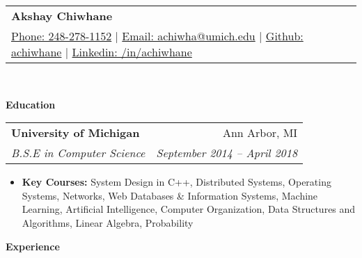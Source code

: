 \documentclass[letterpaper,11pt]{article}
\makeatletter
\newcommand{\resitem}[1]{\item #1 \vspace{-2pt}}
\newcommand{\resheading}[1]{{\large \colorbox{mygrey}{\begin{minipage}{\textwidth}{\textbf{#1 \vphantom{p\^{E}}}}\end{minipage}}}}
\newcommand{\ressubheading}[4]{
\begin{tabular*}{6.875in}{l@{\extracolsep{\fill}}r}
		\textbf{#1} & #2 \\
		\textit{#3} & \textit{#4} \\
\end{tabular*}\vspace{-6pt}}
\renewcommand{\footnotesize}{\fontsize{10pt}{11pt}\selectfont}
\makeatother
\begin{document}
\newcommand{\mywebheader}{
	\begin{tabular*}{7in}{l@{\extracolsep{\fill}}r}
		\textbf{{\LARGE Akshay Chiwhane}} \\
		\href{tel:248-278-1152}{Phone: 248-278-1152} |
		\href{mailto:achiwha@umich.edu}{Email: achiwha@umich.edu} |
		\href{https://github.com/achiwhane}{Github: achiwhane} |
		\href{https://linkedin.com/in/achiwhane}{Linkedin: /in/achiwhane}	\end{tabular*}
		\\
		\vspace{0.1in}}
						
		\mywebheader
		\resheading{Education}
		\begin{description}
			\item
			\ressubheading{{University of Michigan}}{Ann Arbor, MI}{B.S.E in Computer Science}{September 2014 -- April 2018}
			{ \footnotesize
				\begin{itemize}
					\resitem{\textbf{Key Courses:}
						System Design in C++,
						Distributed Systems,
						Operating Systems, 
						Networks,
						Web Databases \& Information Systems,
						Machine Learning,
						Artificial Intelligence,
						Computer Organization,
						Data Structures and Algorithms,
						Linear Algebra,
						Probability
					}
				\end{itemize}
			}
		\end{description} %
		\resheading{Experience}
\end{document}
